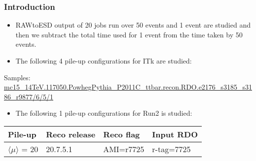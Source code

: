 \documentclass{beamer}
\begin{document}
\begin{frame}
\frametitle{Introduction}
\vspace*{0.2cm}
\begin{itemize}
\item {\small RAWtoESD output of 20 jobs run over 50 events and 1 event are studied and then 
we subtract the total time used for 1 event from the time taken by 50 events.}%
\item The following 4 pile-up configurations for ITk are studied:
\end{itemize}
\begin{center}
{}
\vspace*{.1cm}
{\scriptsize{Samples: \url{mc15_14TeV.117050.PowhegPythia_P2011C_ttbar.recon.RDO.e2176_s3185_s3186_r9877/6/5/1}}}
\vspace*{.1cm}
\begin{itemize}
\item The following 1 pile-up configurations for Run2 is studied:
\end{itemize}
\vspace*{.1cm}
\begin{tabular}{llll}\hline\hline
Pile-up & Reco release & Reco flag & Input RDO  \\\hline
$\langle \mu \rangle$ = 20    & 20.7.5.1    & AMI=r7725 & r-tag=7725 \\
\hline \hline
\end{tabular}


\end{center}
\end{frame}
\end{document}
